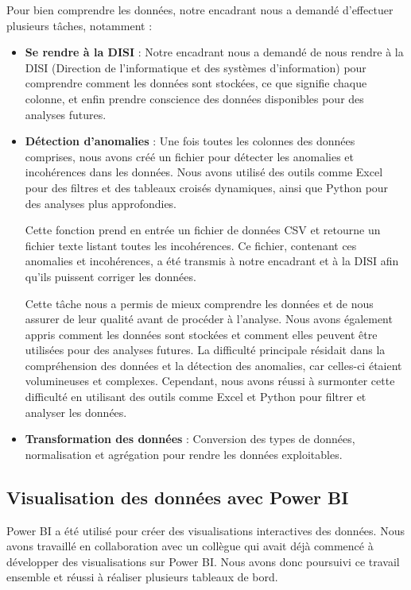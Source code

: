 Pour bien comprendre les données, notre encadrant nous a demandé d’effectuer plusieurs tâches, notamment :
\begin{itemize}
    \item \textbf{Se rendre à la DISI} : Notre encadrant nous a demandé de nous rendre à la DISI (Direction de l’informatique et des systèmes d’information) pour comprendre comment les données sont stockées, ce que signifie chaque colonne, et enfin prendre conscience des données disponibles pour des analyses futures.
    \item \textbf{Détection d’anomalies} : Une fois toutes les colonnes des données comprises, nous avons créé un fichier pour détecter les anomalies et incohérences dans les données. Nous avons utilisé des outils comme Excel pour des filtres et des tableaux croisés dynamiques, ainsi que Python pour des analyses plus approfondies.

    Cette fonction prend en entrée un fichier de données CSV et retourne un fichier texte listant toutes les incohérences.  
    Ce fichier, contenant ces anomalies et incohérences, a été transmis à notre encadrant et à la DISI afin qu’ils puissent corriger les données.

    Cette tâche nous a permis de mieux comprendre les données et de nous assurer de leur qualité avant de procéder à l’analyse. Nous avons également appris comment les données sont stockées et comment elles peuvent être utilisées pour des analyses futures.  
    La difficulté principale résidait dans la compréhension des données et la détection des anomalies, car celles-ci étaient volumineuses et complexes. Cependant, nous avons réussi à surmonter cette difficulté en utilisant des outils comme Excel et Python pour filtrer et analyser les données.
    \item \textbf{Transformation des données} : Conversion des types de données, normalisation et agrégation pour rendre les données exploitables.
\end{itemize}

\subsection{Visualisation des données avec Power BI}  
Power BI a été utilisé pour créer des visualisations interactives des données. Nous avons travaillé en collaboration avec un collègue qui avait déjà commencé à développer des visualisations sur Power BI. Nous avons donc poursuivi ce travail ensemble et réussi à réaliser plusieurs tableaux de bord.

